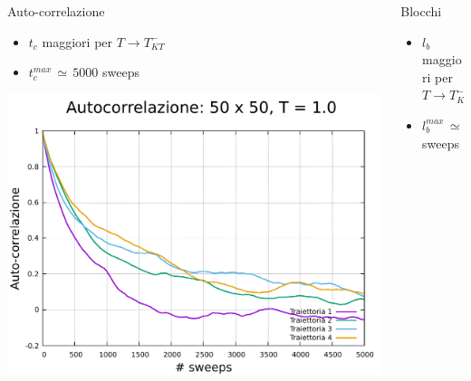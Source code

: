 \begin{frame}
\begin{columns}
\begin{column}{0.33\textwidth}
\begin{block}{Auto-correlazione}
                \begin{itemize}[itemsep=0.5em, label=$\diamond$]
                    \item $t_{c}$ maggiori per $T \to T_{KT}^-$
                    \item $t_{c}^{max}\,\simeq\,5000$ sweeps
                \end{itemize}

                \vspace{0.5cm}

                \centering
                \includegraphics[width=\textwidth]{../ModelloXY/analisi/tcorr/auto/autoGraph/auto_50_1.0.pdf}

            \end{block}
        \end{column}

        \begin{column}{0.33\textwidth}
            \begin{block}{Blocchi}
                
                \begin{itemize}[itemsep=0.5em, label=$\diamond$]
                    \item $l_{b}$ maggiori per $T \to T_{KT}^-$
                    \item $l_{b}^{max}\,\simeq\,10000$ sweeps
                \end{itemize}

                \vspace{0.5cm}


\end{block}
\end{column}
\end{columns}
\end{frame}
